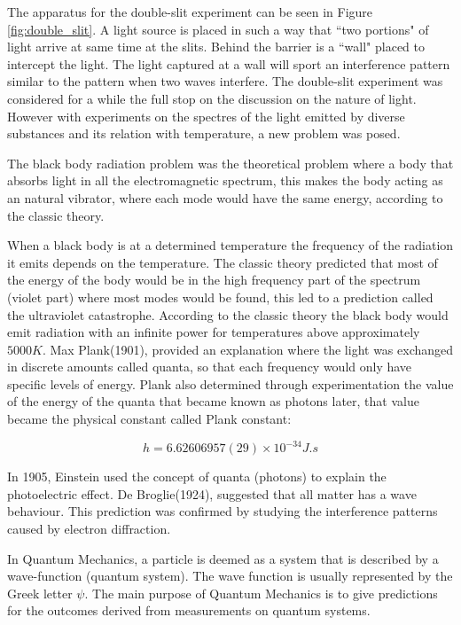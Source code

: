 The apparatus for the double-slit experiment can be seen in Figure \ref{fig:double_slit}. A light source is placed in such a way that ``two portions" of light arrive at same time at the slits. Behind the barrier is a ``wall" placed to intercept the light. 
The light captured at a wall will sport an interference pattern similar to the pattern when two  waves interfere.
The double-slit experiment was considered for a while the full stop on the discussion on the nature of light.
However with experiments on the spectres of the light emitted by diverse substances and its relation with temperature, a new problem was posed. 


The black body radiation problem was the theoretical problem where a body that absorbs light in all the electromagnetic spectrum, this makes the body acting as an natural vibrator, where each mode would have the same energy, according to the classic theory. 

When a black body is at a determined temperature the frequency of the radiation it emits depends on the temperature. The classic theory predicted that most of the energy of the body would be in the high frequency part of the spectrum (violet part) where most modes would be found, this led to a prediction called the ultraviolet catastrophe. According to the classic theory the black body would emit radiation with an infinite power for temperatures above approximately $5000K$. 
Max Plank(1901), provided an explanation where the light was exchanged in discrete amounts called quanta, so that each frequency would only have specific levels of energy. Plank also determined through experimentation the value of the energy of the quanta that became known as photons later, that value became the physical constant called Plank constant:

\begin{equation}
\label{eq:plankconstant}
h = 6.62606957(29) \times 10^{-34} J.s
\end{equation}

In 1905, Einstein used the concept of quanta (photons) to explain the photoelectric effect. 
De Broglie(1924), suggested that all matter has a wave behaviour. This prediction was confirmed by studying the interference patterns caused by electron diffraction. 

In Quantum Mechanics, a particle is deemed as a system that is described by a wave-function (quantum system). The wave function is usually represented by the Greek letter $\psi$. The main purpose of Quantum Mechanics is to give predictions for the outcomes derived from measurements on quantum systems\cite{Nikoli2008}.


